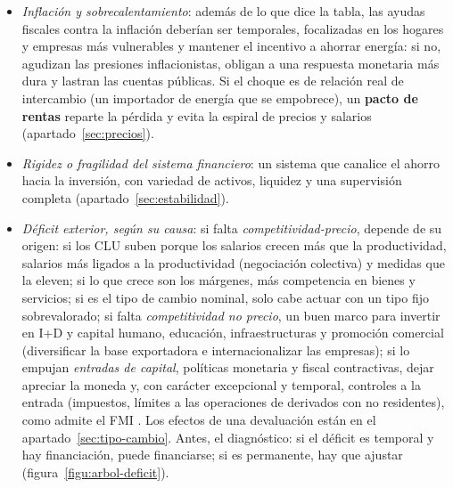 \documentclass[11pt]{article}
\begin{document}
\begin{itemize}
\begin{itemize}
  \item a medio plazo, más oferta donde se concentra la demanda (suelo, licencias, vivienda social en alquiler);\footnote{El FMI recomienda a España acelerar el desarrollo urbanístico, simplificar y agilizar las licencias, retomar la reforma de la ley del suelo y reforzar la vivienda social en alquiler en las zonas con más escasez, y que el control de alquileres sea temporal y condicionado a que las comunidades autónomas tomen medidas para aumentar la oferta. Los estudios que cita sobre Cataluña encuentran bajadas moderadas de los alquileres (4-6~\%) y caídas de los anuncios de alquiler del 15-30~\% \parencite[págs.~29 y 81]{FMI2026ArticuloIV}.}
  \item la vivienda cara también empeora la movilidad y el emparejamiento laboral (apartado~\ref{sec:trabajo}): si el cuadro lo muestra (Beveridge alejada del origen con precios al alza), es un argumento más para actuar.
  \end{itemize}
\item \emph{Inflación y sobrecalentamiento}: además de lo que dice la tabla, las ayudas fiscales contra la inflación deberían ser temporales, focalizadas en los hogares y empresas más vulnerables y mantener el incentivo a ahorrar energía: si no, agudizan las presiones inflacionistas, obligan a una respuesta monetaria más dura y lastran las cuentas públicas. Si el choque es de relación real de intercambio (un importador de energía que se empobrece), un \textbf{pacto de rentas} reparte la pérdida y evita la espiral de precios y salarios (apartado~\ref{sec:precios}).
\item \emph{Rigidez o fragilidad del sistema financiero}: un sistema que canalice el ahorro hacia la inversión, con variedad de activos, liquidez y una supervisión completa (apartado~\ref{sec:estabilidad}).
\item \emph{Déficit exterior, según su causa}: si falta \emph{competitividad-precio}, depende de su origen: si los CLU suben porque los salarios crecen más que la productividad, salarios más ligados a la productividad (negociación colectiva) y medidas que la eleven; si lo que crece son los márgenes, más competencia en bienes y servicios; si es el tipo de cambio nominal, solo cabe actuar con un tipo fijo sobrevalorado; si falta \emph{competitividad no precio}, un buen marco para invertir en I+D y capital humano, educación, infraestructuras y promoción comercial (diversificar la base exportadora e internacionalizar las empresas); si lo empujan \emph{entradas de capital}, políticas monetaria y fiscal contractivas, dejar apreciar la moneda y, con carácter excepcional y temporal, controles a la entrada (impuestos, límites a las operaciones de derivados con no residentes), como admite el FMI \parencite{FMI2012VisionInstitucional}. Los efectos de una devaluación están en el apartado~\ref{sec:tipo-cambio}. Antes, el diagnóstico: si el déficit es temporal y hay financiación, puede financiarse; si es permanente, hay que ajustar (figura~\ref{figu:arbol-deficit}).

\end{itemize}
\end{document}
